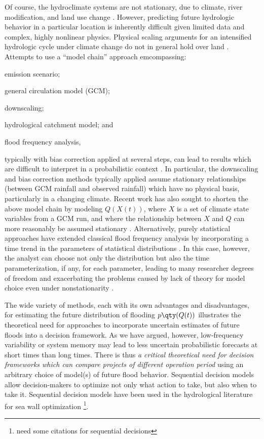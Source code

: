 \documentclass[11pt]{article}
\begin{document}
Of course, the hydroclimate systems are not stationary, due to climate, river modification, and land use change \citep{Milly2008,Merz2014}.
However, predicting future hydrologic behavior in a particular location is inherently difficult given limited data and complex, highly nonlinear physics.
Physical scaling arguments for an intensified hydrologic cycle under climate change \citep[see][]{Muller2011,OGorman2015} do not in general hold over land \citep{Byrne2015,Shaw2016}.
Attempts to use a ``model chain'' approach emcompassing:
\begin{enumerate*}[label=(\roman*)]
  \item emission scenario;
  \item general circulation model (GCM);
  \item downscaling;
  \item hydrological catchment model; and
  \item flood frequency analysis,
\end{enumerate*}
typically with bias correction applied at several steps, can lead to results which are difficult to interpret in a probabilistic context \citep{Dankers2009,Ott2013,Merz2014,Dittes2017}.
In particular, the downscaling and bias correction methods typically applied assume stationary relationships (\ie between GCM rainfall and observed rainfall) which have no physical basis, particularly in a changing climate.
Recent work has also sought to shorten the above model chain by modeling $Q(X(t))$, where $X$ is a set of climate state variables from a GCM run, and where the relationship between $X$ and $Q$ can more reasonably be assumed stationary \citep{Hall2014,Delgado2014,Silva2016}.
Alternatively, purely statistical approaches have extended classical flood frequency analysis by incorporating a time trend in the parameters of statistical distributions \citep{Obeysekera2014,Vogel2011,Serinaldi2015,Strupczewski2001}.
In this case, however, the analyst can choose not only the distribution but also  the time parameterization, if any, for each parameter, leading to many researcher degrees of freedom \citep[``forking paths'' or ``multiple comparisons'';][]{Gelman2013} and exacerbating the problems caused by lack of theory for model choice even under nonstationarity \citep{Kidson2016}.

The wide variety of methods, each with its own advantages and disadvantages, for estimating the future distribution of flooding $p \qty(Q(t))$ illustrates the theoretical need for approaches to incorporate uncertain estimates of future floods into a decision framework.
As we have argued, however, low-frequency variability or system memory may lead to less uncertain probabilistic forecasts at short times than long times.
There is thus \emph{a critical theoretical need for decision frameworks which can compare projects of different operation period} using an arbitrary choice of model(s) of future flood behavior.
Sequential decision models \citep[see][]{Russell2003,Howard1960} allow decision-makers to optimize not only what action to take, but also when to take it.
Sequential decision models have been used in the hydrological literature for sea wall optimization \citep{Lickley2014}\footnote{need some citations for sequential decisions}.
\end{document}
